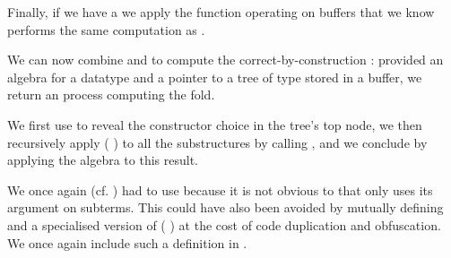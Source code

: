 Finally, if we have a  we apply the function operating
on buffers that we know performs the same computation as .


We can now combine  and  to compute
the correct-by-construction : provided an algebra for
a datatype  and a pointer to a tree of type 
stored in a buffer, we return an  process computing the fold.


We first use  to reveal the constructor choice in the
tree's top node, we then recursively apply ( )
to all the substructures by calling , and we conclude by
applying the algebra to this result.

We once again (cf. ) had to
use \assertTotal{} because it is not obvious to
\idris{} that  only uses its argument on subterms.
%
This could have also been avoided by mutually defining 
and a specialised version of
( \IdrisKeyword{(} \IdrisKeyword{)})
at the cost of code duplication and obfuscation.
%
We once again include such a definition in .
